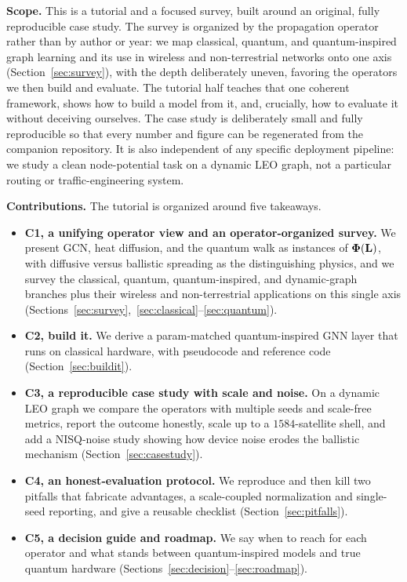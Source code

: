\textbf{Scope.} This is a tutorial and a focused survey, built around an original,
fully reproducible case study. The survey is organized by the propagation operator
rather than by author or year: we map classical, quantum, and quantum-inspired graph learning and its use in
wireless and non-terrestrial networks onto one axis (Section~\ref{sec:survey}), with the
depth deliberately uneven, favoring the operators we then build and evaluate. The
tutorial half teaches that one coherent framework, shows how to build a model from it,
and, crucially, how to evaluate it without deceiving ourselves. The case study is
deliberately small and fully reproducible so that every number and figure can be
regenerated from the companion repository. It is also independent of any specific
deployment pipeline: we study a clean node-potential task on a dynamic LEO graph, not a
particular routing or traffic-engineering system.

\textbf{Contributions.} The tutorial is organized around five takeaways.
\begin{itemize}
\item \textbf{C1, a unifying operator view and an operator-organized survey.} We present
GCN, heat diffusion, and the quantum walk as instances of $\boldsymbol{\Phi}(\mathbf{L})$, with diffusive
versus ballistic spreading as the distinguishing physics, and we survey the classical,
quantum, quantum-inspired, and dynamic-graph branches plus their wireless and
non-terrestrial applications on this single axis
(Sections~\ref{sec:survey},~\ref{sec:classical}--\ref{sec:quantum}).
\item \textbf{C2, build it.} We derive a param-matched quantum-inspired GNN layer that
runs on classical hardware, with pseudocode and reference code (Section~\ref{sec:buildit}).
\item \textbf{C3, a reproducible case study with scale and noise.} On a dynamic LEO graph
we compare the operators with multiple seeds and scale-free metrics, report the outcome
honestly, scale up to a $1584$-satellite shell, and add a NISQ-noise study showing how
device noise erodes the ballistic mechanism (Section~\ref{sec:casestudy}).
\item \textbf{C4, an honest-evaluation protocol.} We reproduce and then kill two
pitfalls that fabricate advantages, a scale-coupled normalization and single-seed
reporting, and give a reusable checklist (Section~\ref{sec:pitfalls}).
\item \textbf{C5, a decision guide and roadmap.} We say when to reach for each
operator and what stands between quantum-inspired models and true quantum hardware
(Sections~\ref{sec:decision}--\ref{sec:roadmap}).
\end{itemize}

